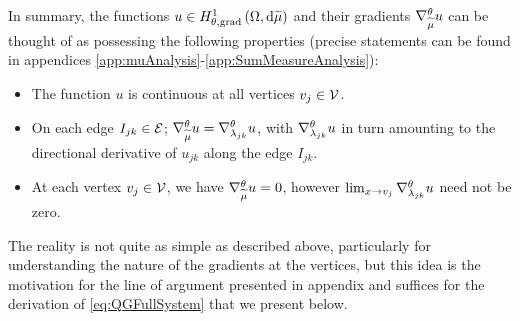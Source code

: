 In summary, the functions $u\in H^1_{\theta, \mathrm{grad}}\left( \Omega, \mathrm{d}\widetilde{\mu} \right)$ and their gradients $\nabla^{\theta}_{\widetilde{\mu}}u$ can be thought of as possessing the following properties (precise statements can be found in appendices \ref{app:muAnalysis}-\ref{app:SumMeasureAnalysis}):
\begin{itemize}
	\item The function $u$ is continuous at all vertices $v_j\in\mathcal{V}$.
	\item On each edge $I_{jk}\in\mathcal{E}$; $\nabla^{\theta}_{\widetilde{\mu}}u = \nabla^{\theta}_{\lambda_{jk}}u$, with $\nabla^{\theta}_{\lambda_{jk}}u$ in turn amounting to the directional derivative of $u_{jk}$ along the edge $I_{jk}$.
	\item At each vertex $v_j\in\mathcal{V}$, we have $\nabla^{\theta}_{\widetilde{\mu}}u=0$, however $\lim_{x\rightarrow v_j}\nabla^{\theta}_{\lambda_{jk}}u$ need not be zero.
\end{itemize}
The reality is not quite as simple as described above, particularly for understanding the nature of the gradients at the vertices, but this idea is the motivation for the line of argument presented in appendix  and suffices for the derivation of \eqref{eq:QGFullSystem} that we present below. \newline

